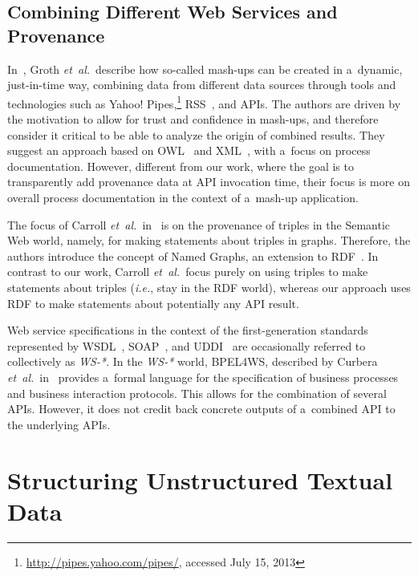 \subsection{Combining Different Web Services and Provenance}

In~\cite{groth2009mashups}, Groth \emph{et~al.}\ describe
how so-called mash-ups can be created in a~dynamic,
just-in-time way, combining data from different data sources
through tools and technologies such as
Yahoo! Pipes,\footnote{\url{http://pipes.yahoo.com/pipes/},
accessed July 15, 2013}
RSS~\cite{cadenhead2006rss}, and APIs.
The authors are driven by the motivation to allow for trust
and confidence in mash-ups, and therefore
consider it critical to be able to analyze the origin
of combined results.
They suggest an approach based on OWL~\cite{mcguinness2004owl}
and XML~\cite{bray2008xml},
with a~focus on process documentation.
However, different from our work, where the goal is to transparently
add provenance data at API invocation time,
their focus is more on overall process documentation
in the context of a~mash-up application.

The focus of Carroll \emph{et~al.}\ in~\cite{carroll2005namedgraphs}
is on the provenance of triples in the Semantic Web world, namely,
for making statements about triples in graphs.
Therefore, the authors introduce the concept of Named Graphs,
an extension to RDF~\cite{klyne2004rdf}.
In contrast to our work, Carroll \emph{et~al.}\ focus
purely on using triples to make statements about triples
(\emph{i.e.}, stay in the RDF world),
whereas our approach uses RDF to make statements
about potentially any API result.
 
Web service specifications in the context of the 
first-generation standards represented by WSDL~\cite{christensen2001wsdl},
SOAP~\cite{gudgin2007soap}, and UDDI~\cite{sabbouh2001uddi}
are occasionally referred to collectively as \emph{WS-*}.
In the \emph{WS-*} world, BPEL4WS, described by
Curbera \emph{et~al.}\ in~\cite{curbera2003bpel4ws}
provides a~formal language for the specification of
business processes and business interaction protocols.
This allows for the combination of several APIs.
However, it does not credit back concrete outputs of a~combined API
to the underlying APIs.

\section{Structuring Unstructured Textual Data} 
\label{sec:structuring}

